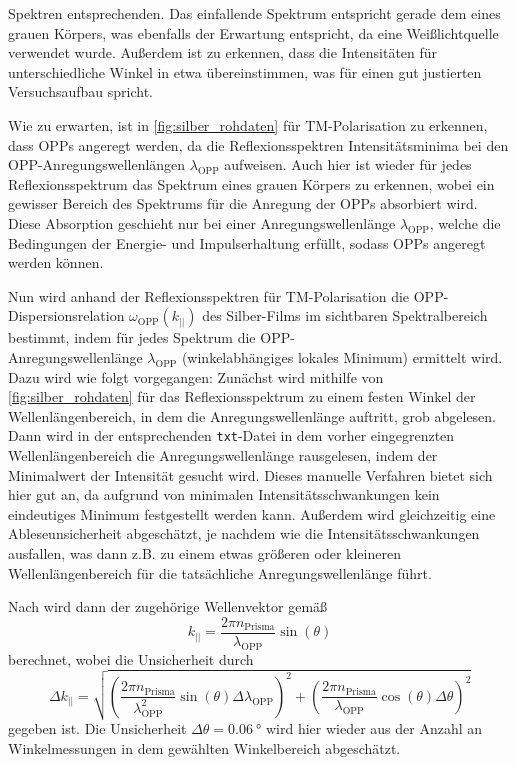 Spektren entsprechenden. Das einfallende Spektrum entspricht gerade dem eines grauen Körpers, was ebenfalls der Erwartung entspricht, da eine Weißlichtquelle
verwendet wurde. Außerdem ist zu erkennen, dass die Intensitäten für unterschiedliche Winkel in etwa übereinstimmen, was für einen gut justierten Versuchsaufbau spricht.\par
Wie zu erwarten, ist in \cref{fig:silber_rohdaten} für TM-Polarisation zu erkennen, dass OPPs angeregt werden, da die Reflexionsspektren Intensitätsminima
bei den OPP-Anregungswellenlängen $\lambda_{\mathrm{OPP}}$ aufweisen. Auch hier ist wieder für jedes Reflexionsspektrum das Spektrum eines grauen Körpers zu erkennen,
wobei ein gewisser Bereich des Spektrums für die Anregung der OPPs absorbiert wird. Diese Absorption geschieht nur bei einer Anregungswellenlänge $\lambda_{\mathrm{OPP}}$,
welche die Bedingungen der Energie- und Impulserhaltung erfüllt, sodass OPPs angeregt werden können.\par
Nun wird anhand der Reflexionsspektren für TM-Polarisation die OPP-Dispersionsrelation $\omega_{\mathrm{OPP}}(k_{||})$ des Silber-Films im sichtbaren Spektralbereich
bestimmt, indem für jedes Spektrum die OPP-\\Anregungswellenlänge $\lambda_{\mathrm{OPP}}$ (winkelabhängiges lokales Minimum) ermittelt wird. Dazu wird wie folgt vorgegangen:
Zunächst wird mithilfe von \cref{fig:silber_rohdaten} für das Reflexionsspektrum zu einem festen Winkel der Wellenlängenbereich, in dem die Anregungswellenlänge auftritt, grob abgelesen.
Dann wird in der entsprechenden \texttt{txt}-Datei in dem vorher eingegrenzten Wellenlängenbereich die Anregungswellenlänge rausgelesen, indem der Minimalwert
der Intensität gesucht wird. Dieses manuelle Verfahren bietet sich hier gut an, da aufgrund von minimalen Intensitätsschwankungen kein eindeutiges Minimum
festgestellt werden kann. Außerdem wird gleichzeitig eine Ableseunsicherheit abgeschätzt, je nachdem wie die Intensitätsschwankungen ausfallen, was dann z.B.
zu einem etwas größeren oder kleineren Wellenlängenbereich für die tatsächliche Anregungswellenlänge führt.\par
Nach \cite{skript} wird dann der zugehörige Wellenvektor gemäß
\begin{equation*}
	k_{||} = \frac{2\pi n_{\mathrm{Prisma}}}{\lambda_{\mathrm{OPP}}} \sin(\theta)
\end{equation*} berechnet, wobei die Unsicherheit durch
\begin{equation*}
	\Delta k_{||} = \sqrt{\left(\frac{2\pi n_{\mathrm{Prisma}}}{\lambda_{\mathrm{OPP}}^2} \sin(\theta) \Delta \lambda_{\mathrm{OPP}}\right)^2 + \left(\frac{2\pi n_{\mathrm{Prisma}}}{\lambda_{\mathrm{OPP}}} \cos(\theta) \Delta \theta\right)^2}
\end{equation*} gegeben ist. Die Unsicherheit $\Delta \theta = \SI{0,06}{\degree}$ wird hier wieder aus der Anzahl an Winkelmessungen in dem gewählten Winkelbereich abgeschätzt.
